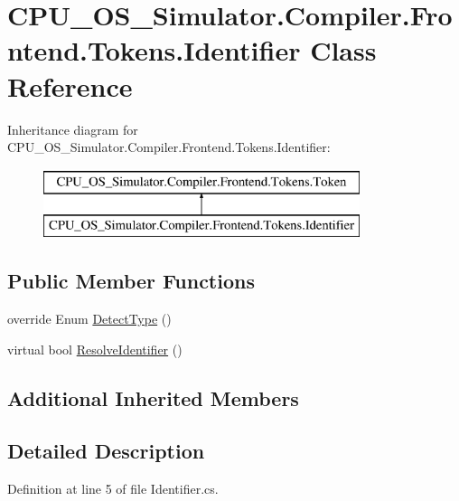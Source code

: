 \hypertarget{class_c_p_u___o_s___simulator_1_1_compiler_1_1_frontend_1_1_tokens_1_1_identifier}{}\section{C\+P\+U\+\_\+\+O\+S\+\_\+\+Simulator.\+Compiler.\+Frontend.\+Tokens.\+Identifier Class Reference}
\label{class_c_p_u___o_s___simulator_1_1_compiler_1_1_frontend_1_1_tokens_1_1_identifier}
Inheritance diagram for C\+P\+U\+\_\+\+O\+S\+\_\+\+Simulator.\+Compiler.\+Frontend.\+Tokens.\+Identifier\+:\begin{figure}[H]
\begin{center}
\leavevmode
\includegraphics[height=2.000000cm]{class_c_p_u___o_s___simulator_1_1_compiler_1_1_frontend_1_1_tokens_1_1_identifier}
\end{center}
\end{figure}
\subsection*{Public Member Functions}
\begin{DoxyCompactItemize}
\item 
override Enum \hyperlink{class_c_p_u___o_s___simulator_1_1_compiler_1_1_frontend_1_1_tokens_1_1_identifier_aa5d0544de3699b5403b38e5978877fe1}{Detect\+Type} ()
\item 
virtual bool \hyperlink{class_c_p_u___o_s___simulator_1_1_compiler_1_1_frontend_1_1_tokens_1_1_identifier_a037942e3b86389700edc6f5aaff9ce5f}{Resolve\+Identifier} ()
\end{DoxyCompactItemize}
\subsection*{Additional Inherited Members}


\subsection{Detailed Description}


Definition at line 5 of file Identifier.\+cs.



